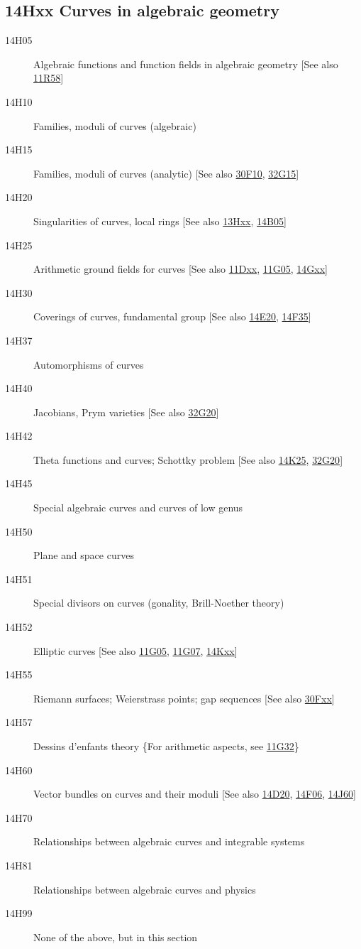 \documentclass[letterpaper]{article}
\begin{document}
\subsection*{14Hxx Curves in algebraic geometry}\label{14Hxx}
\begin{description}               
\item [14H05]\label{14H05} Algebraic functions and function fields in algebraic geometry [See also \hyperref[11R58]{11R58}]
\item [14H10]\label{14H10} Families, moduli of curves (algebraic)
\item [14H15]\label{14H15} Families, moduli of curves (analytic) [See also \hyperref[30F10]{30F10}, \hyperref[32G15]{32G15}]
\item [14H20]\label{14H20} Singularities of curves, local rings [See also \hyperref[13Hxx]{13Hxx}, \hyperref[14B05]{14B05}]
\item [14H25]\label{14H25} Arithmetic ground fields for curves [See also \hyperref[11Dxx]{11Dxx}, \hyperref[11G05]{11G05}, \hyperref[14Gxx]{14Gxx}]
\item [14H30]\label{14H30} Coverings of curves, fundamental group [See also \hyperref[14E20]{14E20}, \hyperref[14F35]{14F35}]
\item [14H37]\label{14H37} Automorphisms of curves
\item [14H40]\label{14H40} Jacobians, Prym varieties [See also \hyperref[32G20]{32G20}]
\item [14H42]\label{14H42} Theta functions and curves; Schottky problem [See also \hyperref[14K25]{14K25}, \hyperref[32G20]{32G20}]
\item [14H45]\label{14H45} Special algebraic curves and curves of low genus
\item [14H50]\label{14H50} Plane and space curves
\item [14H51]\label{14H51} Special divisors on curves (gonality, Brill-Noether theory)
\item [14H52]\label{14H52} Elliptic curves [See also \hyperref[11G05]{11G05}, \hyperref[11G07]{11G07}, \hyperref[14Kxx]{14Kxx}]
\item [14H55]\label{14H55} Riemann surfaces; Weierstrass points; gap sequences [See also \hyperref[30Fxx]{30Fxx}]
\item [14H57]\label{14H57} Dessins d'enfants theory \{For arithmetic aspects, see \hyperref[11G32]{11G32}\}
\item [14H60]\label{14H60} Vector bundles on curves and their moduli [See also \hyperref[14D20]{14D20}, \hyperref[14F06]{14F06}, \hyperref[14J60]{14J60}]
\item [14H70]\label{14H70} Relationships between algebraic curves and integrable systems
\item [14H81]\label{14H81} Relationships between algebraic curves and physics
\item [14H99]\label{14H99} None of the above, but in this section
\end{description}          
\end{document}
